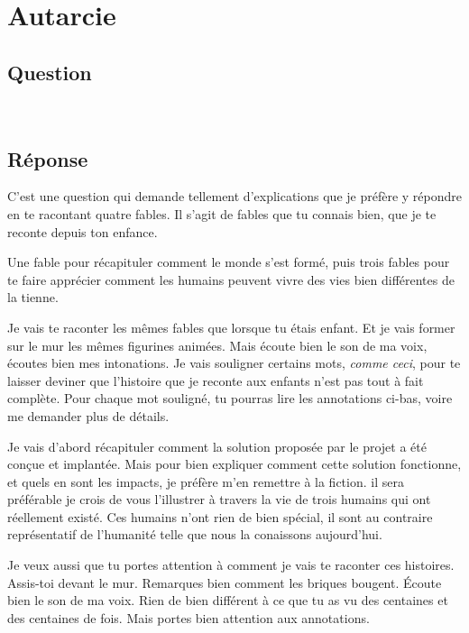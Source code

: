 \chapter{Autarcie}

\section*{Question}

\noindent\colorbox{gray!30}{}\\

\section*{Réponse}


C'est une question qui demande tellement d'explications que je préfère y
répondre en te racontant quatre fables. Il s'agit de fables que tu connais bien,
que je te reconte depuis ton enfance. 

Une fable pour récapituler comment le monde s'est formé, puis trois fables pour
te faire apprécier comment les humains peuvent vivre des vies bien différentes
de la tienne.

Je vais te raconter les mêmes fables que lorsque tu étais enfant.  Et je vais
former sur le mur les mêmes figurines animées.  Mais écoute bien le son de ma
voix, écoutes bien mes intonations.  Je vais souligner certains mots,
\textit{comme ceci}, pour te laisser deviner que l'histoire que je reconte aux
enfants n'est pas tout à fait complète.  Pour chaque mot souligné, tu pourras
lire les annotations ci-bas, voire me demander plus de détails.

\colorbox{gray!30}{}

Je vais d'abord récapituler comment la solution proposée par le projet
\nomProjet{} a été conçue et implantée.  Mais pour bien expliquer comment cette
solution fonctionne, et quels en sont les impacts, je préfère m'en remettre à
la fiction.  il sera préférable je crois de vous l'illustrer à travers la vie
de trois humains qui ont réellement existé. Ces humains n'ont rien de bien
spécial, il sont au contraire représentatif de l'humanité telle que nous la
conaissons aujourd'hui.

Je veux aussi que tu portes attention à comment je vais te raconter ces histoires.
Assis-toi devant le mur. Remarques bien comment les briques bougent.
Écoute bien le son de ma voix.
Rien de bien différent à ce que tu as vu des centaines et des centaines de fois.
Mais portes bien attention aux annotations.


